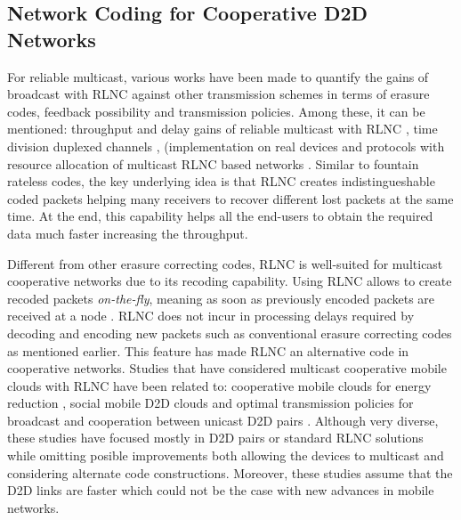 \subsection{Network Coding for Cooperative D2D Networks}

For reliable multicast, various works have been made to quantify the gains of broadcast with \ac{RLNC} against other transmission schemes in terms of erasure codes, feedback possibility and transmission policies. Among these, it can be mentioned: throughput and delay gains of reliable multicast with \ac{RLNC} \cite{eryilmaz2008delay}, time division duplexed channels \cite{lucani2009random,lucani2009queue}, (implementation on real devices \cite{heide2009network} and protocols with resource allocation of multicast \ac{RLNC} based networks \cite{vukobratovic2014random,chiti2013optimized,tassi2015resource}. Similar to fountain rateless codes, the key underlying idea is that \ac{RLNC} creates indistingueshable coded packets helping many receivers to recover different lost packets at the same time. At the end, this capability helps all the end-users to obtain the required data much faster increasing the throughput.

Different from other erasure correcting codes, \ac{RLNC} is well-suited for multicast cooperative networks due to its recoding capability. Using \ac{RLNC} allows to create recoded packets \textit{on-the-fly}, meaning as soon as previously encoded packets are received at a node \cite{sundararajan2008online,lucani2010online,toemoeskoezi2015packet}. \ac{RLNC} does not incur in processing delays required by decoding and encoding new packets such as conventional erasure correcting codes as mentioned earlier. This feature has made \ac{RLNC} an alternative code in cooperative networks. Studies that have considered multicast cooperative mobile clouds with \ac{RLNC} have been related to: cooperative mobile clouds for energy reduction \cite{heide2012green}, social mobile \ac{D2D} clouds \cite{fitzek2013implementation} and optimal transmission policies for broadcast and cooperation between unicast \ac{D2D} pairs \cite{khamfroush2013minimizing,khamfroush2015optimal}. Although very diverse, these studies have focused mostly in \ac{D2D} pairs or standard \ac{RLNC} solutions while omitting posible improvements both allowing the devices to multicast and considering alternate code constructions. Moreover, these studies assume that the \ac{D2D} links are faster which could not be the case with new advances in mobile networks.

\clearpage
